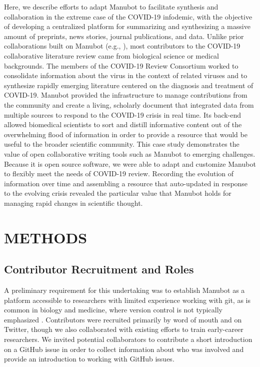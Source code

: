 \documentclass[twocolumn]{ceurart}
\begin{document}
Here, we describe efforts to adapt Manubot to facilitate synthesis and collaboration in the extreme case of the COVID-19 infodemic, with the objective of developing a centralized platform for summarizing and synthesizing a massive amount of preprints, news stories, journal publications, and data.
Unlike prior collaborations built on Manubot (e.g., \citep{17a3WKGzu, PZMP42Ak}), most contributors to the COVID-19 collaborative literature review came from biological science or medical backgrounds.
The members of the COVID-19 Review Consortium worked to consolidate information about the virus in the context of related viruses and to synthesize rapidly emerging literature centered on the diagnosis and treatment of COVID-19.
Manubot provided the infrastructure to manage contributions from the community and create a living, scholarly document that integrated data from multiple sources to respond to the COVID-19 crisis in real time.
Its back-end allowed biomedical scientists to sort and distill informative content out of the overwhelming flood of information \citep{1HZeeO4Cs} in order to provide a resource that would be useful to the broader scientific community.
This case study demonstrates the value of open collaborative writing tools such as Manubot to emerging challenges.
Because it is open source software, we were able to adapt and customize Manubot to flexibly meet the needs of COVID-19 review.
Recording the evolution of information over time and assembling a resource that auto-updated in response to the evolving crisis revealed the particular value that Manubot holds for managing rapid changes in scientific thought.

\hypertarget{methods}{%
\section{METHODS}\label{methods}}

\hypertarget{contributor-recruitment-and-roles}{%
\subsection{Contributor Recruitment and Roles}\label{contributor-recruitment-and-roles}}

A preliminary requirement for this undertaking was to establish Manubot as a platform accessible to researchers with limited experience working with git, as is common in biology and medicine, where version control is not typically emphasized \citep{1HmO21gZN, OO1DuZd, 4ny1onB0}.
Contributors were recruited primarily by word of mouth and on Twitter, though we also collaborated with existing efforts to train early-career researchers.
We invited potential collaborators to contribute a short introduction on a GitHub issue in order to collect information about who was involved and provide an introduction to working with GitHub issues.
\end{document}
